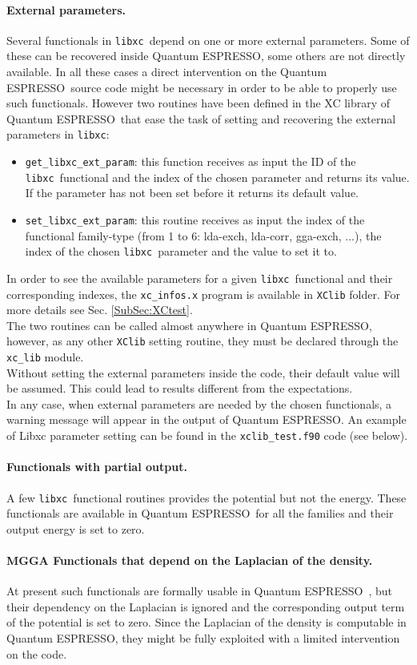 \documentclass[12pt,a4paper]{article}
\def\qe{{\sc Quantum ESPRESSO}}
\def\libxc{\texttt{libxc}}
\begin{document}
\paragraph{External parameters.}
Several functionals in \libxc\ depend on one or more external parameters. Some of these can be recovered inside \qe, some others are not directly available. In all these cases a direct intervention on the \qe\ source code might be necessary in order to be able to properly use such functionals. However two routines have been defined in the XC library of \qe\ that ease the task of setting and recovering the external parameters in \libxc:
\begin{itemize}
	\item \texttt{get\_libxc\_ext\_param}: this function receives as input the ID of the \libxc\ functional and the index of the chosen parameter and returns its value. If the parameter has not been set before it returns its default value.
	\item \texttt{set\_libxc\_ext\_param}: this routine receives as input the index of the functional family-type (from 1 to 6: lda-exch, lda-corr, gga-exch, ...), the index of the chosen \libxc\ parameter and the value to set it to.
\end{itemize}
In order to see the available parameters for a given \libxc\ functional and their corresponding indexes, the \texttt{xc\_infos.x} program is available in \texttt{XClib} folder. For more details see Sec. \ref{SubSec:XCtest}.\\
The two routines can be called almost anywhere in \qe, however, as any other \texttt{XClib} setting routine, they must be declared through the \texttt{xc\_lib} module.\\
Without setting the external parameters inside the code, their default value will be assumed. This could lead to results different from the expectations.\\
In any case, when external parameters are needed by the chosen functionals, a warning message will appear in the output of \qe. An example of Libxc parameter setting can be found in the \texttt{xclib\_test.f90} code (see below).
%
\paragraph{Functionals with partial output.}
A few \libxc\ functional routines provides the potential but not the energy. These functionals are available in \qe\ for all the families and their output energy is set to zero.
%
\paragraph{MGGA Functionals that depend on the Laplacian of the density.} At present such functionals are formally usable in \qe\ , but their dependency on the Laplacian is ignored and the corresponding output term of the potential is set to zero. Since the Laplacian of the density is computable in \qe, they might be fully exploited with a limited intervention on the code.
%
\end{document}
